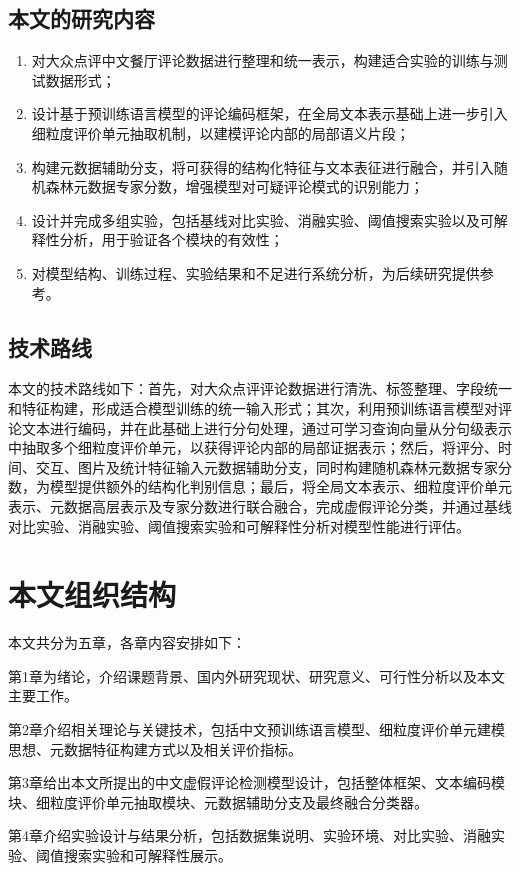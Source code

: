 \documentclass[UTF8,oneside,openright,fontset=none]{ctexbook}
\numberwithin{equation}{chapter}
\begin{document}
\subsection{本文的研究内容}
\begin{enumerate}
  \item 对大众点评中文餐厅评论数据进行整理和统一表示，构建适合实验的训练与测试数据形式；
  \item 设计基于预训练语言模型的评论编码框架，在全局文本表示基础上进一步引入细粒度评价单元抽取机制，以建模评论内部的局部语义片段；
  \item 构建元数据辅助分支，将可获得的结构化特征与文本表征进行融合，并引入随机森林元数据专家分数，增强模型对可疑评论模式的识别能力；
  \item 设计并完成多组实验，包括基线对比实验、消融实验、阈值搜索实验以及可解释性分析，用于验证各个模块的有效性；
  \item 对模型结构、训练过程、实验结果和不足进行系统分析，为后续研究提供参考。
\end{enumerate}

\subsection{技术路线}
本文的技术路线如下：首先，对大众点评评论数据进行清洗、标签整理、字段统一和特征构建，形成适合模型训练的统一输入形式；其次，利用预训练语言模型对评论文本进行编码，并在此基础上进行分句处理，通过可学习查询向量从分句级表示中抽取多个细粒度评价单元，以获得评论内部的局部证据表示；然后，将评分、时间、交互、图片及统计特征输入元数据辅助分支，同时构建随机森林元数据专家分数，为模型提供额外的结构化判别信息；最后，将全局文本表示、细粒度评价单元表示、元数据高层表示及专家分数进行联合融合，完成虚假评论分类，并通过基线对比实验、消融实验、阈值搜索实验和可解释性分析对模型性能进行评估。

\section{本文组织结构}
本文共分为五章，各章内容安排如下：

第1章为绪论，介绍课题背景、国内外研究现状、研究意义、可行性分析以及本文主要工作。

第2章介绍相关理论与关键技术，包括中文预训练语言模型、细粒度评价单元建模思想、元数据特征构建方式以及相关评价指标。

第3章给出本文所提出的中文虚假评论检测模型设计，包括整体框架、文本编码模块、细粒度评价单元抽取模块、元数据辅助分支及最终融合分类器。

第4章介绍实验设计与结果分析，包括数据集说明、实验环境、对比实验、消融实验、阈值搜索实验和可解释性展示。
\end{document}
